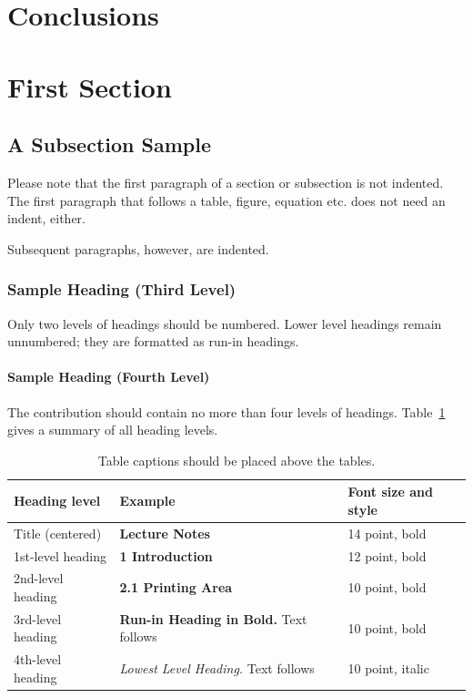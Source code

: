 \documentclass{llncs}
\begin{document}
\section{Conclusions}

\section{First Section}
\subsection{A Subsection Sample}
Please note that the first paragraph of a section or subsection is
not indented. The first paragraph that follows a table, figure,
equation etc. does not need an indent, either.

Subsequent paragraphs, however, are indented.

\subsubsection{Sample Heading (Third Level)} Only two levels of
headings should be numbered. Lower level headings remain unnumbered;
they are formatted as run-in headings.

\paragraph{Sample Heading (Fourth Level)}
The contribution should contain no more than four levels of
headings. Table~\ref{tab1} gives a summary of all heading levels.

\begin{table}
\caption{Table captions should be placed above the
tables.}\label{tab1}
\begin{tabular}{|l|l|l|}
\hline
Heading level &  Example & Font size and style\\
\hline
Title (centered) &  {\Large\bfseries Lecture Notes} & 14 point, bold\\
1st-level heading &  {\large\bfseries 1 Introduction} & 12 point, bold\\
2nd-level heading & {\bfseries 2.1 Printing Area} & 10 point, bold\\
3rd-level heading & {\bfseries Run-in Heading in Bold.} Text follows & 10 point, bold\\
4th-level heading & {\itshape Lowest Level Heading.} Text follows & 10 point, italic\\
\hline
\end{tabular}
\end{table}
\end{document}
